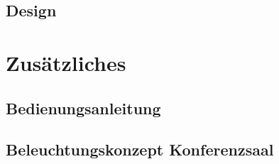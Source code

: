 \documentclass[
    headings=optiontotocandhead,%
    twoside,
    numbers=noenddot,%
    toc=flat, %
    12pt, %
    titlepage, %
    parskip=full, %
    listof=totoc, %
    listof=flat, %
    numbers=noenddot, %
    bibliography=totoc, %
    a4paper,DIV=14,
    BCOR=15mm,
]{scrbook}
\begin{document}
\renewcommand{\kapitelautor}{Autor: Dominik Nußbaumer}

    

\section{Design}\label{Design}

\renewcommand{\kapitelautor}{Autor: Dominik Nußbaumer}

    

\chapter{Zusätzliches}\label{Zusätzliches}

\section{Bedienungsanleitung}\label{Bedienungsanleitung}

\renewcommand{\kapitelautor}{Autor: Clemens Scharwitzl}

% 

\section{Beleuchtungskonzept Konferenzsaal}\label{Beleuchtungskonzept-Konferenzsaal}

\renewcommand{\kapitelautor}{Autor: Florian Steiner}








% 
\end{document}
